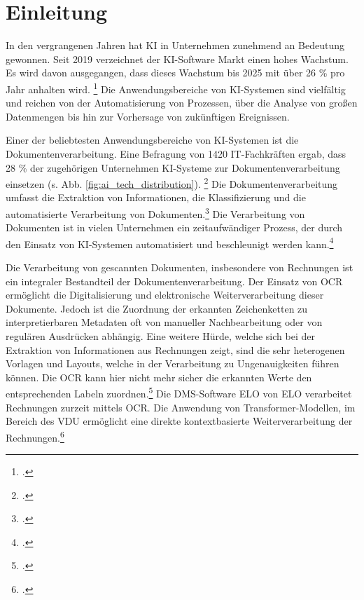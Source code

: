 \chapter{Einleitung}

In den vergrangenen Jahren hat \ac{KI} in Unternehmen zunehmend an Bedeutung gewonnen. Seit 2019 verzeichnet der KI-Software Markt einen hohes Wachstum. Es wird davon ausgegangen, dass dieses Wachstum bis 2025 mit über 26 \% pro Jahr anhalten wird. \footcites[Vgl.][]{howarth_57_2024} Die Anwendungsbereiche von KI-Systemen sind vielfältig und reichen von der Automatisierung von Prozessen, über die Analyse von großen Datenmengen bis hin zur Vorhersage von zukünftigen Ereignissen.

Einer der beliebtesten Anwendungsbereiche von KI-Systemen ist die Dokumentenverarbeitung. Eine Befragung von 1420 IT-Fachkräften ergab, dass 28 \% der zugehörigen Unternehmen KI-Systeme zur Dokumentenverarbeitung einsetzen (s. Abb. \ref{fig:ai_tech_distribution}). \footcites[Vgl.][]{rackspace_most_2023} Die Dokumentenverarbeitung umfasst die Extraktion von Informationen, die Klassifizierung und die automatisierte Verarbeitung von Dokumenten.\footcites[Vgl.][S. 1]{esposito_intelligent_2005} Die Verarbeitung von Dokumenten ist in vielen Unternehmen ein zeitaufwändiger Prozess, der durch den Einsatz von KI-Systemen automatisiert und beschleunigt werden kann.\footcites[Vgl.][S. 11]{dutt_now_2024}



Die Verarbeitung von gescannten Dokumenten, insbesondere von Rechnungen ist ein integraler Bestandteil der Dokumentenverarbeitung. Der Einsatz von \ac{OCR} ermöglicht die Digitalisierung und elektronische Weiterverarbeitung dieser Dokumente. Jedoch ist die Zuordnung der erkannten Zeichenketten zu interpretierbaren Metadaten oft von manueller Nachbearbeitung oder von regulären Ausdrücken abhängig. Eine weitere Hürde, welche sich bei der Extraktion von Informationen aus Rechnungen zeigt, sind die sehr heterogenen Vorlagen und Layouts, welche in der Verarbeitung zu Ungenauigkeiten führen können. Die OCR kann hier nicht mehr sicher die erkannten Werte den entsprechenden Labeln zuordnen.\footcites[Vgl.][S. 1]{rahal_information_2018} Die DMS-Software \ac{ELO} von ELO verarbeitet Rechnungen zurzeit mittels OCR. Die Anwendung von Transformer-Modellen, im Bereich des \ac{VDU} ermöglicht eine direkte kontextbasierte Weiterverarbeitung der Rechnungen.\footcites[Vgl.][S. 1]{kim_ocr-free_2021}

